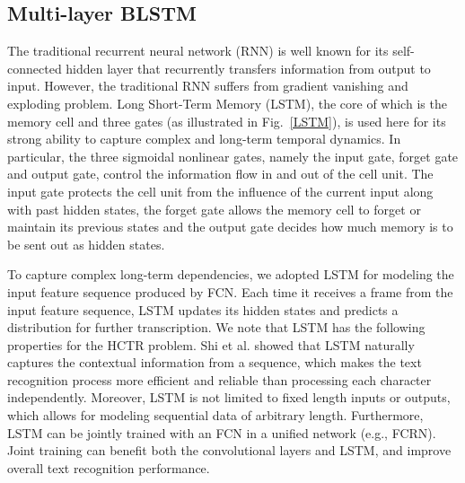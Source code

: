 \documentclass[10pt,conference,a4paper]{IEEEtran}
\begin{document}
\subsection{Multi-layer BLSTM}
The traditional recurrent neural network (RNN) is well known for its self-connected hidden layer that recurrently transfers information from output to input.
However, the traditional RNN suffers from gradient vanishing and exploding problem.
Long Short-Term Memory (LSTM)\cite{hochreiter1997long}, the core of which is the memory cell and three gates (as illustrated in Fig.~\ref{LSTM}), is used here for its strong ability to capture complex and long-term temporal dynamics.
In particular, the three sigmoidal nonlinear gates, namely the input gate, forget gate and output gate, control the information flow in and out of the cell unit.
The input gate protects the cell unit from the influence of the current input along with past hidden states,
the forget gate allows the memory cell to forget or maintain its previous states
and the output gate decides how much memory is to be sent out as hidden states.

To capture complex long-term dependencies, we adopted LSTM for modeling the input feature sequence produced by FCN.
Each time it receives a frame from the input feature sequence, LSTM updates its hidden states and predicts a distribution for further transcription. We note that LSTM has the following properties for the HCTR problem.
Shi et al.\cite{shi2015end} showed that LSTM naturally captures the contextual information from a sequence, which makes the text recognition process more efficient and reliable than processing each character independently.
Moreover, LSTM is not limited to fixed length inputs or outputs, which allows for modeling sequential data of arbitrary length.
Furthermore, LSTM can be jointly trained with an FCN in a unified network (e.g., FCRN).
Joint training can benefit both the convolutional layers and LSTM, and improve overall text recognition performance. %


\end{document}
